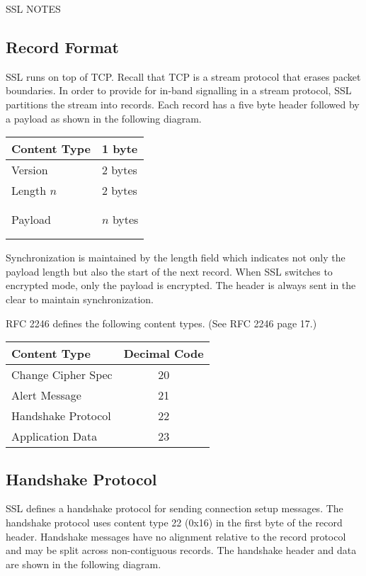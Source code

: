 \documentclass[11pt]{article}
\begin{document}
\begin{center}
{\sc SSL NOTES}
\end{center}

\subsection*{Record Format}
SSL runs on top of TCP.
Recall that TCP is a stream protocol that erases packet boundaries.
In order to provide for in-band signalling in a stream protocol,
SSL partitions the stream into records.
Each record has a five byte header followed by a payload as shown
in the following diagram.

\begin{center}
\begin{tabular}{|ll|}
\hline
Content Type & 1 byte\\
\hline
Version & 2 bytes\\
\hline
Length $n$ & 2 bytes\\
\hline
&\\
&\\
Payload & $n$ bytes\\
&\\
&\\
\hline
\end{tabular}
\end{center}

Synchronization is maintained by the length field which indicates not only
the payload length but also the start of the next record.
When SSL switches to encrypted mode, only the payload is encrypted.
The header is always sent in the clear to maintain synchronization.

RFC 2246 defines the following content types. (See RFC 2246 page 17.)

\begin{center}
\begin{tabular}{|l|c|}
\hline
Content Type & Decimal Code\\
\hline
Change Cipher Spec & 20\\
Alert Message & 21\\
Handshake Protocol & 22\\
Application Data & 23\\
\hline
\end{tabular}
\end{center}

\subsection*{Handshake Protocol}
SSL defines a handshake protocol for sending connection setup messages.
The handshake protocol uses content type 22 (0x16) in the
first byte of the record header.
Handshake messages have no alignment relative to the record protocol
and may be split across non-contiguous records.
The handshake header and data are shown in the following diagram.
\end{document}
